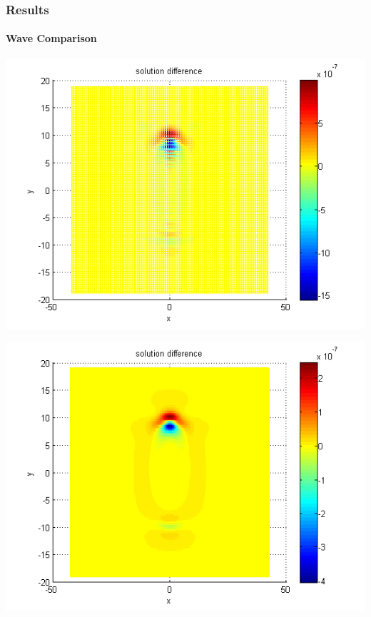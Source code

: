\documentclass{beamer}
\begin{document}
\begin{frame}
\frametitle{Results}
\framesubtitle{Wave Comparison}
\begin{center}\vspace{0.4cm}
	\begin{minipage}[b]{0.32\linewidth}
		\includegraphics[width=\linewidth]{figures/compare_128_bt1_c09_h040.png}
	\end{minipage}	
	\begin{minipage}[b]{0.32\linewidth}
		\includegraphics[width=\linewidth]{figures/compare_128_bt1_c09_h020.png}
	\end{minipage}	
	\begin{minipage}[b]{0.32\linewidth}

\end{minipage}
\end{center}
\end{frame}
\end{document}
